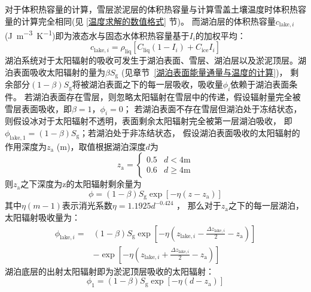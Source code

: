 对于体积热容量的计算，雪层淤泥层的体积热容量与计算雪盖土壤温度时体积热容量的计算完全相同(见 \ref{温度求解的数值格式} 节)。
而湖泊层的体积热容量$c_{\mathrm{lake},i}$ (\unit{J.m^{-3}.K^{-1}})即为液态水与固态水体积热容量基于$I_i$的加权平均：
\begin{equation}
  c_{\mathrm{lake},i}=\rho_{\mathrm{liq}}\left[C_{\mathrm{liq}}\left(1-I_{i}\right)+C_{\mathrm{ice}} I_{i}\right]
\end{equation}
湖泊系统对于太阳辐射的吸收可发生于湖泊表面、雪层、湖泊层以及淤泥顶层。湖泊表面吸收太阳辐射的量为$\beta S_{\mathrm {g}} $ (见章节~\ref{湖泊表面能量通量与温度的计算})，
剩余部分$\left(1-\beta\right)S_{\mathrm {g}}$将被湖泊表面之下的每一层吸收，吸收量$\phi_i$依赖于湖泊表面条件。
若湖泊表面存在雪层，则忽略太阳辐射在雪层中的传递，假设辐射量完全被雪层表面吸收，即$\beta=1$，$\phi_i=0$；
若湖泊表面不存在雪层但湖泊处于冻结状态，则假设冰对于太阳辐射不透明，表面剩余太阳辐射完全被第一层湖泊吸收，
即$\phi_{\mathrm{lake,1}}=\left(1-\beta\right)S_{\mathrm {g}} $；若湖泊处于非冻结状态，
假设湖泊表面吸收的太阳辐射的作用深度为$z_{\mathrm {a}} $ (m)，取值根据湖泊深度$d$为
\begin{equation}
  z_{\mathrm{a}}=\left\{\begin{array}{ll}0.5 & d<4 \text{m} \\ 0.6 & d \geqslant 4 \text{m}\end{array}\right.
\end{equation}
则$z_{\mathrm {a}} $之下深度为z的太阳辐射剩余量为
\begin{equation}
  \phi=(1-\beta) S_{\mathrm{g}} \exp \left[-\eta\left(z-z_{\mathrm{a}}\right)\right]
\end{equation}
其中$\eta(m-1)$表示消光系数$\eta=1.1925d^{-0.424}$ \citep{subin2012improved}，
那么对于$z_{\mathrm {a}} $之下的每一层湖泊，太阳辐射吸收量为：
\begin{equation}
  \begin{split}
    \phi_{\mathrm{lake},i}= & (1-\beta) S_{\mathrm{g}} \exp \left[-\eta\left(z_{\mathrm{lake},i}-\frac{\Delta z_{\mathrm{lake},i}}{2}-z_{\mathrm{a}}\right)\right] \\
    & -\exp \left[-\eta\left(z_{\mathrm{lake},i}+\frac{\Delta z_{\mathrm{lake},i}}{2}-z_{\mathrm{a}}\right)\right]
  \end{split}
\end{equation}
湖泊底层的出射太阳辐射即为淤泥顶层吸收的太阳辐射：
\begin{equation}
  \phi_{1}=(1-\beta) S_{\mathrm{g}} \exp \left[-\eta\left(d-z_{\mathrm{a}}\right)\right]
\end{equation}
